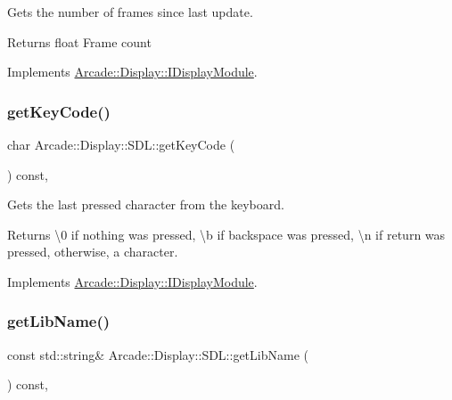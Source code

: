 Gets the number of frames since last update. 

\begin{DoxyReturn}{Returns}
float Frame count 
\end{DoxyReturn}


Implements \mbox{\hyperlink{classArcade_1_1Display_1_1IDisplayModule_aab078d82e6fdd32682553947c20226ac}{Arcade\+::\+Display\+::\+I\+Display\+Module}}.

\mbox{\label{classArcade_1_1Display_1_1SDL_a3ba94b49b72c9e189f52af7b97f4ad91}} 
\subsubsection{\texorpdfstring{getKeyCode()}{getKeyCode()}}
{\footnotesize\ttfamily char Arcade\+::\+Display\+::\+S\+D\+L\+::get\+Key\+Code (\begin{DoxyParamCaption}{ }\end{DoxyParamCaption}) const\hspace{0.3cm}{\ttfamily [final]}, {\ttfamily [virtual]}}



Gets the last pressed character from the keyboard. 

\begin{DoxyReturn}{Returns}
\textbackslash{}0 if nothing was pressed, \textbackslash{}b if backspace was pressed, \textbackslash{}n if return was pressed, otherwise, a character. 
\end{DoxyReturn}


Implements \mbox{\hyperlink{classArcade_1_1Display_1_1IDisplayModule_a403f8a0f065dad707a881ef3cee79805}{Arcade\+::\+Display\+::\+I\+Display\+Module}}.

\mbox{\label{classArcade_1_1Display_1_1SDL_aa549d6ec470b99b545db63a1d4a2b58e}} 
\subsubsection{\texorpdfstring{getLibName()}{getLibName()}}
{\footnotesize\ttfamily const std\+::string\& Arcade\+::\+Display\+::\+S\+D\+L\+::get\+Lib\+Name (\begin{DoxyParamCaption}{ }\end{DoxyParamCaption}) const\hspace{0.3cm}{\ttfamily [final]}, {\ttfamily [virtual]}}



